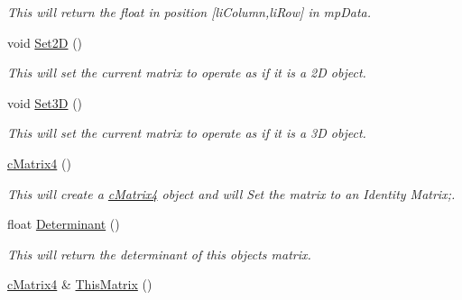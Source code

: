 \begin{DoxyCompactItemize}
\begin{DoxyCompactList}\small\item\em This will return the float in position \mbox{[}liColumn,liRow\mbox{]} in mpData. \end{DoxyCompactList}\item 
\hypertarget{classc_matrix4_ad24236403317622459c3309938be9d21}{
void \hyperlink{classc_matrix4_ad24236403317622459c3309938be9d21}{Set2D} ()}
\label{classc_matrix4_ad24236403317622459c3309938be9d21}

\begin{DoxyCompactList}\small\item\em This will set the current matrix to operate as if it is a 2D object. \end{DoxyCompactList}\item 
\hypertarget{classc_matrix4_a746ce09337cbf6a3292cbe15991efd79}{
void \hyperlink{classc_matrix4_a746ce09337cbf6a3292cbe15991efd79}{Set3D} ()}
\label{classc_matrix4_a746ce09337cbf6a3292cbe15991efd79}

\begin{DoxyCompactList}\small\item\em This will set the current matrix to operate as if it is a 3D object. \end{DoxyCompactList}\item 
\hypertarget{classc_matrix4_a51d8e6bf6bbb6b998878fe978c748e14}{
\hyperlink{classc_matrix4_a51d8e6bf6bbb6b998878fe978c748e14}{cMatrix4} ()}
\label{classc_matrix4_a51d8e6bf6bbb6b998878fe978c748e14}

\begin{DoxyCompactList}\small\item\em This will create a \hyperlink{classc_matrix4}{cMatrix4} object and will Set the matrix to an Identity Matrix;. \end{DoxyCompactList}\item 
\hypertarget{classc_matrix4_a39cf7cefa0672684e69eb4af89366270}{
float \hyperlink{classc_matrix4_a39cf7cefa0672684e69eb4af89366270}{Determinant} ()}
\label{classc_matrix4_a39cf7cefa0672684e69eb4af89366270}

\begin{DoxyCompactList}\small\item\em This will return the determinant of this objects matrix. \end{DoxyCompactList}\item 
\hypertarget{classc_matrix4_ac39fd297327a7103ff26e227bec5295e}{
\hyperlink{classc_matrix4}{cMatrix4} \& \hyperlink{classc_matrix4_ac39fd297327a7103ff26e227bec5295e}{ThisMatrix} ()}
\label{classc_matrix4_ac39fd297327a7103ff26e227bec5295e}


\end{DoxyCompactItemize}
